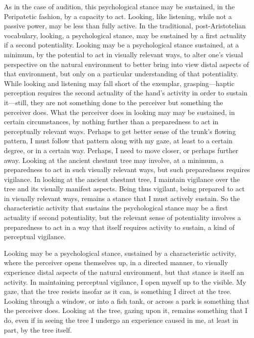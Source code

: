 As in the case of audition, this psychological stance may be sustained, in the Peripatetic fashion, by a capacity to act. Looking, like listening, while not a passive power, may be less than fully active. In the traditional, post-Aristotelian vocabulary, looking, a psychological stance, may be sustained by a first actuality if a second potentiality. Looking may be a psychological stance sustained, at a minimum, by the potential to act in visually relevant ways, to alter one's visual perspective on the natural environment to better bring into view distal aspects of that environment, but only on a particular understanding of that potentiality. While looking and listening may fall short of the exemplar, grasping---haptic perception requires the second actuality of the hand's activity in order to sustain it---still, they are not something done to the perceiver but something the perceiver does. What the perceiver does in looking may may be sustained, in certain circumstances, by nothing further than a preparedness to act in perceptually relevant ways. Perhaps to get better sense of the trunk's flowing pattern, I must follow that pattern along with my gaze, at least to a certain degree, or in a certain way. Perhaps, I need to move closer, or perhaps further away. Looking at the ancient chestnut tree may involve, at a minimum, a preparedness to act in such visually relevant ways, but such preparedness requires vigilance. In looking at the ancient chestnut tree, I maintain vigilance over the tree and its visually manifest aspects. Being thus vigilant, being prepared to act in visually relevant ways, remains a stance that I must actively sustain. So the characteristic activity that sustains the psychological stance may be a first actuality if second potentiality, but the relevant sense of potentiality involves a preparedness to act in a way that itself requires activity to sustain, a kind of perceptual vigilance.

Looking may be a psychological stance, sustained by a characteristic activity, where the perceiver opens themselves up, in a directed manner, to visually experience distal aspects of the natural environment, but that stance is itself an activity. In maintaining perceptual vigilance, I open myself up to the visible. My gaze, that the tree resists insofar as it can, is something I direct at the tree. Looking through a window, or into a fish tank, or across a park is something that the perceiver does. Looking at the tree, gazing upon it, remains something that I do, even if in seeing the tree I undergo an experience caused in me, at least in part, by the tree itself.

